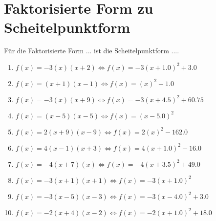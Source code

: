 \documentclass{article}%
\begin{document}
\section{Faktorisierte Form zu Scheitelpunktform}%
\label{sec:FaktorisierteFormzuScheitelpunktform}%
Für die Faktorisierte Form ... ist die Scheitelpunktform ....%
\begin{enumerate}[label=\alph*)]%
\item%
\newline\vspace{0.5cm}$f(x)=-3(x)(x+2)\Leftrightarrow f(x)=-3(x+1.0)^2 +3.0$%
\item%
\newline\vspace{0.5cm}$f(x)=(x+1)(x-1)\Leftrightarrow f(x)=(x)^2 -1.0$%
\item%
\newline\vspace{0.5cm}$f(x)=-3(x)(x+9)\Leftrightarrow f(x)=-3(x+4.5)^2 +60.75$%
\item%
\newline\vspace{0.5cm}$f(x)=(x-5)(x-5)\Leftrightarrow f(x)=(x-5.0)^2$%
\item%
\newline\vspace{0.5cm}$f(x)=2(x+9)(x-9)\Leftrightarrow f(x)=2(x)^2 -162.0$%
\item%
\newline\vspace{0.5cm}$f(x)=4(x-1)(x+3)\Leftrightarrow f(x)=4(x+1.0)^2 -16.0$%
\item%
\newline\vspace{0.5cm}$f(x)=-4(x+7)(x)\Leftrightarrow f(x)=-4(x+3.5)^2 +49.0$%
\item%
\newline\vspace{0.5cm}$f(x)=-3(x+1)(x+1)\Leftrightarrow f(x)=-3(x+1.0)^2$%
\item%
\newline\vspace{0.5cm}$f(x)=-3(x-5)(x-3)\Leftrightarrow f(x)=-3(x-4.0)^2 +3.0$%
\item%
\newline\vspace{0.5cm}$f(x)=-2(x+4)(x-2)\Leftrightarrow f(x)=-2(x+1.0)^2 +18.0$%
\end{enumerate}

%
\end{document}
